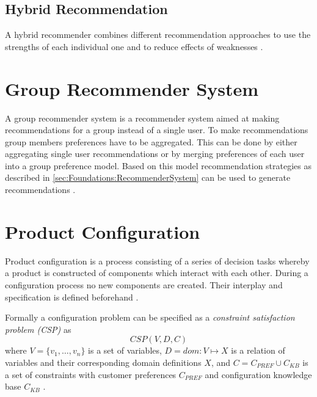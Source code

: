 \subsection{Hybrid Recommendation}
A hybrid recommender combines different recommendation approaches to use the strengths of each individual one and to reduce effects of weaknesses \cite{burkeHybridRecommenderSystems2002}.


\section{Group Recommender System}

A group recommender system is a recommender system aimed at making recommendations for a group instead of a single user. To make recommendations group members preferences have to be aggregated. This can be done by either aggregating single user recommendations or by merging preferences of each user into a group preference model. Based on this model recommendation strategies as described in \ref{sec:Foundations:RecommenderSystem} can be used to generate recommendations \cite{jamesonRecommendationGroups2007}.

\section{Product Configuration}
\label{sec:Foundations:ProductConfiguration}

Product configuration is a process consisting of a series of decision tasks whereby a product is constructed of components which interact with each other. During a configuration process no new components are created. Their interplay and specification is defined beforehand \cite[~ pp. 42, 43]{sabinProductConfigurationFrameworksa1998}.

Formally a configuration problem can be specified as a \emph{constraint satisfaction problem (CSP)} \cite{tsangFoundationsConstraintSatisfaction1993} as 
\[
    CSP(V,D,C)
\]
where \( V = \{v_1,\dots, v_n\} \) is a set of variables, \( D = dom : V \mapsto X \) is a relation of variables and their corresponding domain definitions \( X \), and \( C = C_{PREF} \cup C_{KB} \) is a set of constraints with customer preferences \( C_{PREF} \) and configuration knowledge base \( C_{KB} \) \cite{felferningGroupBasedConfiguration2016, felfernigOpenConfiguration2014}.


